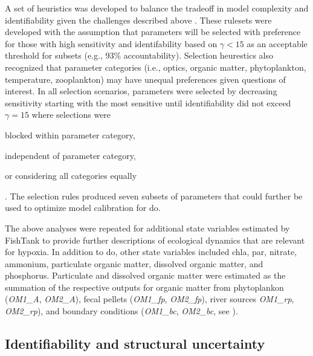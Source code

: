 \documentclass[letterpaper,12pt,oneside]{article}\usepackage[]{graphicx}\usepackage[]{color}
\begin{document}
A set of heuristics was developed to balance the tradeoff in model complexity and identifiability given the challenges described above \citep[see also][]{Wagener01}.  These rulesets were developed with the assumption that parameters will be selected with preference for those with high sensitivity and identifability based on $\gamma < 15$ as an acceptable threshold for subsets (e.g., 93\% accountability).  Selection heurestics also recognized that parameter categories (i.e., optics, organic matter, phytoplankton, temperature, zooplankton) may have unequal preferences given questions of interest.  In all selection scenarios, parameters were selected by decreasing sensitivity starting with the most sensitive until identifiability did not exceed $\gamma = 15$ where selections were \begin{inparaenum}[1\upshape)]
\item blocked within parameter category,
\item independent of parameter category,
\item or considering all categories equally
\end{inparaenum}.  The selection rules produced seven subsets of parameters that could further be used to optimize model calibration for \ac{do}.

The above analyses were repeated for additional state variables estimated by FishTank to provide further descriptions of ecological dynamics that are relevant for hypoxia.  In addition to \ac{do}, other state variables included \ac{chla}, \ac{par}, nitrate, ammonium, particulate organic matter, dissolved organic matter, and phosphorus.  Particulate and dissolved organic matter were estimated as the summation of the respective outputs for organic matter from phytoplankon (\textit{OM1\_A}, \textit{OM2\_A}), fecal pellets (\textit{OM1\_fp}, \textit{OM2\_fp}), river sources \textit{OM1\_rp}, \textit{OM2\_rp}), and boundary conditions (\textit{OM1\_bc}, \textit{OM2\_bc}, see ). 

\subsection{Identifiability and structural uncertainty}
\end{document}
